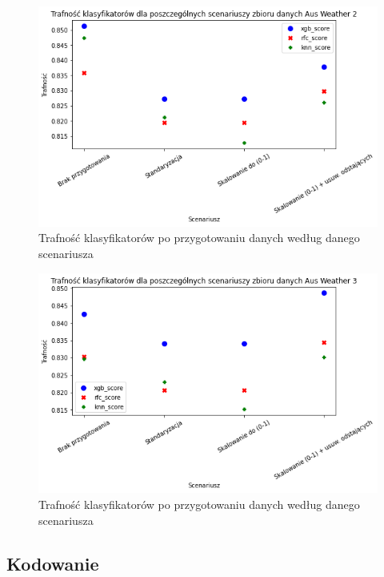 \documentclass{book}
\begin{document}
\begin{figure}[H]
\centerline{\includegraphics[scale=0.5]{Aus_Weather_2_Standaryzacja}}
\centering
\caption{Trafność klasyfikatorów po przygotowaniu danych 
według danego scenariusza}
\end{figure}

\begin{figure}[H]
\centerline{\includegraphics[scale=0.5]{Aus_Weather_3_Standaryzacja}}
\centering
\caption{Trafność klasyfikatorów po przygotowaniu danych 
według danego scenariusza}
\end{figure}

\subsection{Kodowanie}
\end{document}

